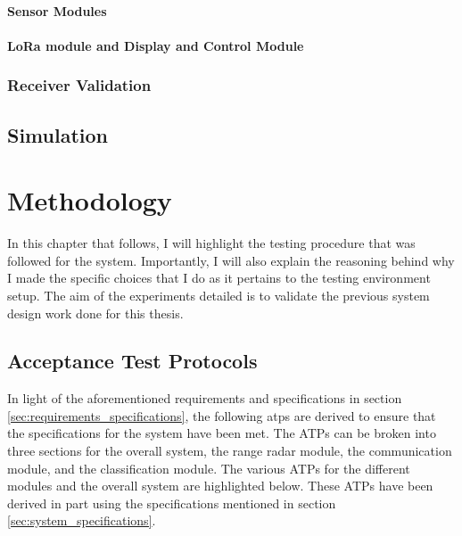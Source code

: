 \documentclass[11pt]{report}
\begin{document}
\subsubsection{Sensor Modules}

\subsubsection{LoRa module and Display and Control Module}

\subsection{Receiver Validation}

\section{Simulation}



\chapter{Methodology}\label{ch:methodology}
In this chapter that follows, I will highlight the testing procedure that was followed for the system. Importantly, I will also explain the reasoning behind why I made the specific choices that I do as it pertains to the testing environment setup. The aim of the experiments detailed is to validate the previous system design work done for this thesis.


\section{Acceptance Test Protocols}
In light of the aforementioned requirements and specifications in section \ref{sec:requirements_specifications}, the following \gls{atps} are derived to ensure that the specifications for the system have been met. The ATPs can be broken into three sections for the overall system, the range radar module, the communication module, and the classification module. The various ATPs for the different modules and the overall system are highlighted below. These ATPs have been derived in part using the specifications mentioned in section \ref{sec:system_specifications}.
\end{document}
